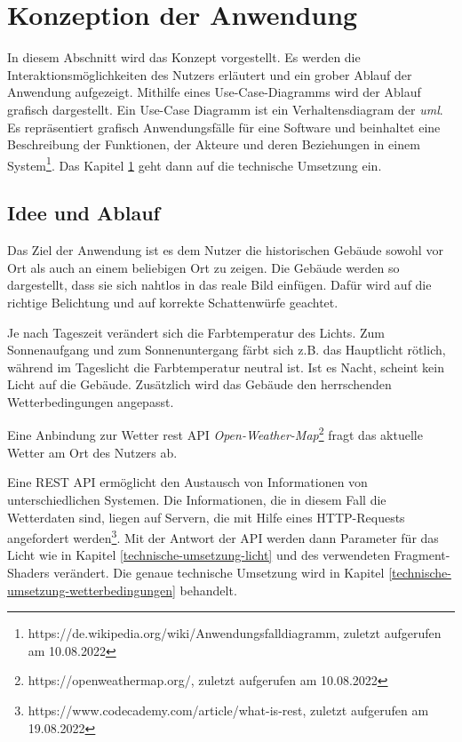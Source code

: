 \section{Konzeption der Anwendung}
In diesem Abschnitt wird das Konzept vorgestellt. Es werden die Interaktionsmöglichkeiten des Nutzers erläutert und ein grober Ablauf der Anwendung aufgezeigt. Mithilfe eines Use-Case-Diagramms wird der Ablauf grafisch dargestellt. Ein Use-Case Diagramm ist ein Verhaltensdiagram der \textit{\acrfull{uml}}. Es repräsentiert grafisch Anwendungsfälle für eine Software und beinhaltet eine Beschreibung der Funktionen, der Akteure und deren Beziehungen in einem System\footnote{https://de.wikipedia.org/wiki/Anwendungsfalldiagramm, zuletzt aufgerufen am 10.08.2022}. Das Kapitel \ref*{} geht dann auf die technische Umsetzung ein.

\subsection{Idee und Ablauf}
\label{konzept-der-anwendung}
Das Ziel der Anwendung ist es dem Nutzer die historischen Gebäude sowohl vor Ort als auch an einem beliebigen Ort zu zeigen. Die Gebäude werden so dargestellt, dass sie sich nahtlos in das reale Bild einfügen. Dafür wird auf die richtige Belichtung und auf korrekte Schattenwürfe geachtet. 

Je nach Tageszeit verändert sich die Farbtemperatur des Lichts. Zum Sonnenaufgang und zum Sonnenuntergang färbt sich z.B. das Hauptlicht rötlich, während im Tageslicht die Farbtemperatur neutral ist. Ist es Nacht, scheint kein Licht auf die Gebäude. Zusätzlich wird das Gebäude den herrschenden Wetterbedingungen angepasst. 

Eine Anbindung zur Wetter \acrfull{rest} API \textit{Open-Weather-Map}\footnote{https://openweathermap.org/, zuletzt aufgerufen am 10.08.2022} fragt das aktuelle Wetter am Ort des Nutzers ab. 

Eine REST API ermöglicht den Austausch von Informationen von unterschiedlichen Systemen. Die Informationen, die in diesem Fall die Wetterdaten sind, liegen auf Servern, die mit Hilfe eines HTTP-Requests angefordert werden\footnote{https://www.codecademy.com/article/what-is-rest, zuletzt aufgerufen am 19.08.2022}. Mit der Antwort der API werden dann Parameter für das Licht wie in Kapitel \ref*{technische-umsetzung-licht} und des verwendeten Fragment-Shaders verändert. Die genaue technische Umsetzung wird in Kapitel \ref*{technische-umsetzung-wetterbedingungen} behandelt. 

